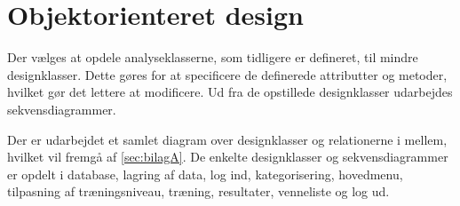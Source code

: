 \section{Objektorienteret design}
Der vælges at opdele analyseklasserne, som tidligere er defineret, til mindre designklasser. Dette gøres for at specificere de definerede attributter og metoder, hvilket gør det lettere at modificere. Ud fra de opstillede designklasser udarbejdes sekvensdiagrammer. 

Der er udarbejdet et samlet diagram over designklasser og relationerne i mellem, hvilket vil fremgå af \autoref{sec:bilagA}. De enkelte designklasser og sekvensdiagrammer er opdelt i database, lagring af data, log ind, kategorisering, hovedmenu, tilpasning af træningsniveau, træning, resultater, venneliste og log ud. 
